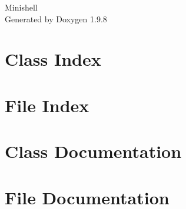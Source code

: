 \documentclass[twoside]{book}
\newcommand{\+}{\discretionary{\mbox{\scriptsize$\hookleftarrow$}}{}{}}
\newcommand{\clearemptydoublepage}{%
    \newpage{\pagestyle{empty}\cleardoublepage}%
  }
\begin{document}
  \raggedbottom
    \hypersetup{pageanchor=false,
                bookmarksnumbered=true,
                pdfencoding=unicode
               }
  \begin{titlepage}
  \vspace*{7cm}
  \begin{center}%
  {\Large Minishell}\\
  \vspace*{1cm}
  {\large Generated by Doxygen 1.9.8}\\
  \end{center}
  \end{titlepage}
  \clearemptydoublepage
  \tableofcontents
  \clearemptydoublepage
  \hypersetup{pageanchor=true}
\chapter{Class Index}

\chapter{File Index}

\chapter{Class Documentation}





\chapter{File Documentation}


















  \backmatter
  \newpage
  \clearemptydoublepage
  \printindex
\end{document}

